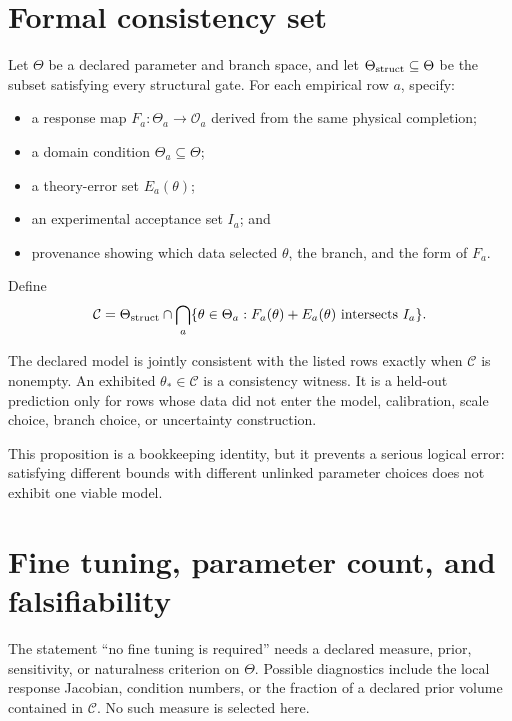 \documentclass[11pt]{article}
\begin{document}
\section{Formal consistency set}

Let $\Theta$ be a declared parameter and branch space, and let
$\Theta_{\rm struct}\subseteq\Theta$ be the subset satisfying every structural
gate. For each empirical row $a$, specify:
\begin{itemize}
\item a response map $F_a:\Theta_a\to\mathcal O_a$ derived from the same
physical completion;
\item a domain condition $\Theta_a\subseteq\Theta$;
\item a theory-error set $E_a(\theta)$;
\item an experimental acceptance set $I_a$; and
\item provenance showing which data selected $\theta$, the branch, and the
form of $F_a$.
\end{itemize}

Define
\[
 \mathcal C
 =\Theta_{\rm struct}
 \cap\bigcap_a
 \{\theta\in\Theta_a:
       F_a(\theta)+E_a(\theta)\text{ intersects }I_a\}.
\]

\begin{proposition}\label{prop:consistency}
The declared model is jointly consistent with the listed rows exactly when
$\mathcal C$ is nonempty. An exhibited $\theta_\ast\in\mathcal C$ is a
consistency witness. It is a held-out prediction only for rows whose data did
not enter the model, calibration, scale choice, branch choice, or uncertainty
construction.
\end{proposition}

This proposition is a bookkeeping identity, but it prevents a serious logical
error: satisfying different bounds with different unlinked parameter choices
does not exhibit one viable model.

\section{Fine tuning, parameter count, and falsifiability}

The statement ``no fine tuning is required'' needs a declared measure, prior,
sensitivity, or naturalness criterion on $\Theta$. Possible diagnostics include
the local response Jacobian, condition numbers, or the fraction of a declared
prior volume contained in $\mathcal C$. No such measure is selected here.
\end{document}
